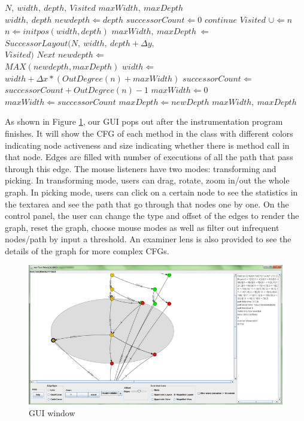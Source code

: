 \documentclass[conference,10pt,twocolumn]{./IEEE/IEEEtran}
\begin{document}
\begin{algorithm}
\begin{algorithmic}[1]
 \REQUIRE $N,\ width,\ depth,\ Visited$
    \ENSURE $maxWidth,\ maxDepth$\\
           \RETURN $width,\ depth$
        \ELSE
            \STATE $newdepth \Leftarrow depth$
            \STATE $successorCount \Leftarrow 0$
	\STATE $continue$
	\ENDIF
	\STATE $Visited$  $\cup \Leftarrow n$
	\STATE $n \Leftarrow initpos(width,depth)$
	\STATE $maxWidth,\ maxDepth\  \Leftarrow$\\$SuccessorLayout(N,\ width,\ depth+\Delta y,$\\$Visited)$
       \STATE $Next$	
	\STATE $newdepth \Leftarrow$\\$MAX(newdepth, maxDepth)$
	\STATE $width \Leftarrow$\\$width+\Delta x * (OutDegree(n)+maxWidth)$
	\STATE $successorCount \Leftarrow$\\$successorCount + OutDegree(n)-1$ 
\ENDFOR
	\STATE $maxWidth \Leftarrow 0$
	\ELSE
	\STATE $maxWidth \Leftarrow successorCount$
        \ENDIF
        \STATE $maxDepth \Leftarrow newDepth$
        \RETURN  $maxWidth,\ maxDepth$
\ENDIF
\end{algorithmic} 
\end{algorithm}

As shown in Figure \ref{gui}, our GUI pops out after the instrumentation program finishes.
It will show the CFG of each method in the class with different colors indicating node activeness and size indicating whether there is method call in that node.
Edges are filled with number of executions of all the path that pass through this edge.
The mouse listeners have two modes: transforming and picking.
In transforming mode, users can drag, rotate, zoom in/out the whole graph.
In picking mode, users can click on a certain node to see the statistics in the textarea and see the path that go through that nodes one by one.
On the control panel, the user can change the type and offset of the edges to render the graph, reset the graph, choose mouse modes as well as filter out infrequent nodes/path by input a threshold.
An examiner lens is also provided to see the details of the graph for more complex CFGs.

\begin{figure}[t]
\center
  \includegraphics[width=\textwidth]{gui.png}
  \caption{GUI window}
  \label{gui}
\end{figure}
\end{document}
